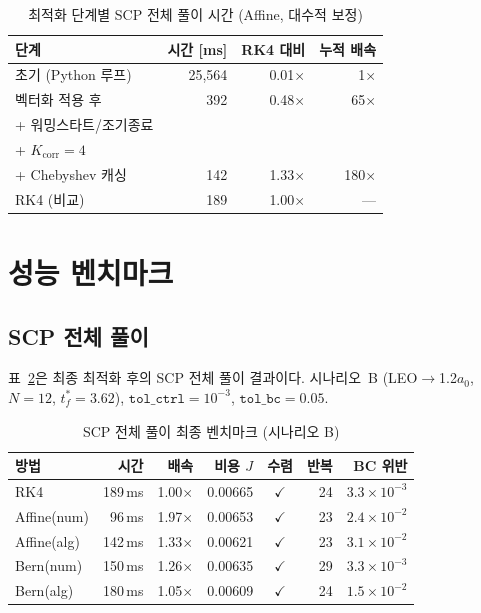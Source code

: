 \documentclass[11pt]{article}
\begin{document}
\begin{table}[h]
\centering
\caption{최적화 단계별 SCP 전체 풀이 시간 (Affine, 대수적 보정)}
\label{tab:optim_stages}
\begin{tabular}{lrrr}
\toprule
단계 & 시간 [ms] & RK4 대비 & 누적 배속 \\
\midrule
초기 (Python 루프)    & 25,564 & 0.01$\times$ & 1$\times$ \\
벡터화 적용 후        & 392    & 0.48$\times$ & 65$\times$ \\
+ 워밍스타트/조기종료  &        &              & \\
\quad + $K_\mathrm{corr}=4$ &   &              & \\
\quad + Chebyshev 캐싱 & 142   & 1.33$\times$ & 180$\times$ \\
\midrule
RK4 (비교)            & 189   & 1.00$\times$ & --- \\
\bottomrule
\end{tabular}
\end{table}


\section{성능 벤치마크}

\subsection{SCP 전체 풀이}

표~\ref{tab:scp_final}은 최종 최적화 후의 SCP 전체 풀이 결과이다.
시나리오~B (LEO$\to$1.2$a_0$, $N=12$, $t_f^* = 3.62$),
$\texttt{tol\_ctrl} = 10^{-3}$, $\texttt{tol\_bc} = 0.05$.

\begin{table}[h]
\centering
\caption{SCP 전체 풀이 최종 벤치마크 (시나리오 B)}
\label{tab:scp_final}
\begin{tabular}{lrrrcrr}
\toprule
방법 & 시간 & 배속 & 비용 $J$ & 수렴 & 반복 & BC 위반 \\
\midrule
RK4              & 189\,ms  & 1.00$\times$ & 0.00665 & $\checkmark$ & 24 & $3.3 \!\times\! 10^{-3}$ \\
Affine(num)      & 96\,ms   & 1.97$\times$ & 0.00653 & $\checkmark$ & 23 & $2.4 \!\times\! 10^{-2}$ \\
Affine(alg)      & 142\,ms  & 1.33$\times$ & 0.00621 & $\checkmark$ & 23 & $3.1 \!\times\! 10^{-2}$ \\
Bern(num)        & 150\,ms  & 1.26$\times$ & 0.00635 & $\checkmark$ & 29 & $3.3 \!\times\! 10^{-3}$ \\
Bern(alg)        & 180\,ms  & 1.05$\times$ & 0.00609 & $\checkmark$ & 24 & $1.5 \!\times\! 10^{-2}$ \\
\bottomrule
\end{tabular}
\end{table}
\end{document}
